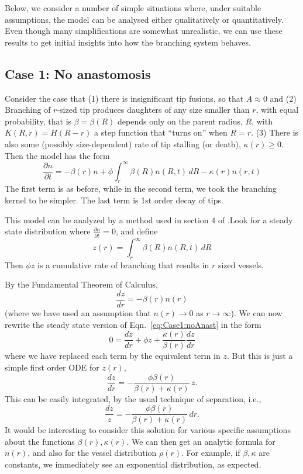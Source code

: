 Below, we consider a number of simple situations where, under suitable assumptions, the model can be analysed either qualitatively or quantitatively. Even though many simplifications are somewhat unrealistic, we can use these results to get initial insights into how the branching system behaves.

\subsection{Case 1: No anastomosis}
Consider the case that (1) there is insignificant tip fusions, so that $A\approx 0$ and (2) Branching of $r$-sized tip produces daughters of any size smaller than $r$, with equal probability, that is $\beta=\beta(R)$ depends only on the parent radius, $R$, with $K(R,r)=H(R-r)$ a step function that ``turns on'' when $R=r$. (3) There is also some (possibly size-dependent) rate of tip stalling (or death), $\kappa(r)\ge 0$.
Then the model has the form
\begin{equation}
	\label{eq:Case1:noAnast}
	\frac{\partial n}{\partial t} = -\beta(r) n + \phi  \int_r^\infty \beta(R) n(R,t) \, dR - \kappa(r) n(r,t)     
\end{equation}
The first term is as before, while in the second term, we took the branching kernel to be simpler. The last term is 1st order decay of tips.

This model can be analyzed by a method used in section 4 of \cite{edelstein2001model}.Look for a steady state distribution where $\frac{\partial n}{\partial t}=0$, and define
\[
z(r)= \int_r^\infty \beta(R) n(R,t) \, dR
\]
Then $\phi z$ is a cumulative rate of branching that results in $r$ sized vessels.

By the Fundamental Theorem of Calculus,
\[
\frac{dz}{dr}= -\beta(r) n(r)
\]
(where we have used an assumption that $n(r)\to 0$ as $r\to \infty$). We can now rewrite the steady state version of Eqn.~\eqref{eq:Case1:noAnast} in the form
\[
0=\frac{dz}{dr} + \phi z +\frac{\kappa(r)}{\beta(r)} \frac{dz}{dr}
\]
where we have replaced each term by the equivalent term in $z$. But this is just a simple first order ODE for $z(r)$,
\[
\frac{dz}{dr}=- \frac{\phi \beta(r)}{\beta(r)+\kappa(r)} \, z.
\]
This can be easily integrated, by the usual technique of separation, i.e.,
\[
\frac{dz}{z}=- \frac{\phi \beta(r)}{\beta(r)+\kappa(r)} \, dr.
\]
It would be interesting to consider this solution for various specific assumptions about the functions $\beta(r),\kappa(r)$. We can then get an analytic formula for $n(r)$, and also for the vessel distribution $\rho(r)$.
For example, if $\beta,\kappa$ are constants, we immediately see an exponential distribution, as expected.



